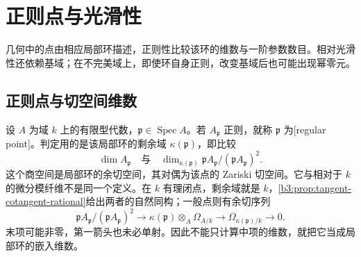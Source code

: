
\section{正则点与光滑性}
\label{b3:sec:1805}

几何中的点由相应局部环描述，正则性比较该环的维数与一阶参数数目。相对光滑性还依赖基域；在不完美域上，即使环自身正则，改变基域后也可能出现幂零元。

%
%
%

\subsection{正则点与切空间维数}
\label{b3:subsec:1805:01}

设 \(A\) 为域 \(k\) 上的有限型代数，\(\mathfrak p\in\operatorname{Spec}A\)。若 \(A_{\mathfrak p}\) 正则，就称 \(\mathfrak p\) 为[regular point]。判定用的是该局部环的剩余域 \(\kappa(\mathfrak p)\)，即比较
\[
	\dim A_{\mathfrak p}\quad\text{与}\quad \dim_{\kappa(\mathfrak p)} \mathfrak pA_{\mathfrak p}/(\mathfrak pA_{\mathfrak p})^2.
\]
这个商空间是局部环的余切空间，其对偶为该点的 Zariski 切空间。它与相对于 \(k\) 的微分模纤维不是同一个定义。在 \(k\) 有理闭点，剩余域就是 \(k\)，\cref{b3:prop:tangent-cotangent-rational}给出两者的自然同构；一般点则有余切序列
\[
	\mathfrak pA_{\mathfrak p}/(\mathfrak pA_{\mathfrak p})^2 \longrightarrow \kappa(\mathfrak p)\otimes_A\Omega_{A/k} \longrightarrow \Omega_{\kappa(\mathfrak p)/k}\longrightarrow0.
\]
末项可能非零，第一箭头也未必单射。因此不能只计算中项的维数，就把它当成局部环的嵌入维数。

